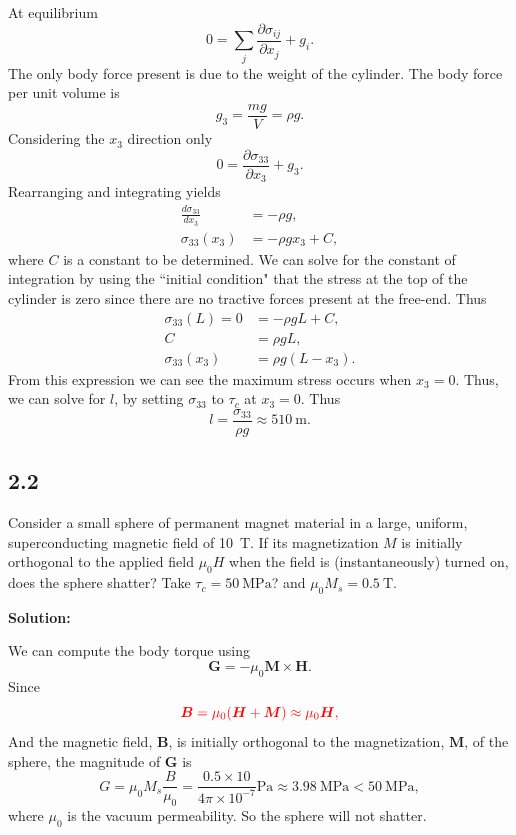 \documentclass[12pt]{article}
\begin{document}
At equilibrium
\begin{equation}
	0 = \sum_{j}\frac{\partial \sigma_{ij}}{\partial x_j} + g_{i}.
\end{equation}
The only body force present is due to the weight of the cylinder. The body force per unit volume is
\begin{equation}
	g_3 = \frac{m g}{V} = \rho g.
\end{equation}
Considering the $x_3$ direction only
\begin{equation}
	0 = \frac{\partial \sigma_{33}}{\partial x_3} + g_{3}.
\end{equation}
Rearranging and integrating yields
\begin{align}
	\frac{ d\sigma_{33} }{ d x_3 } & = -\rho g,         \\
	\sigma_{33}(x_3)               & = -\rho g x_3 + C,
\end{align}
where $C$ is a constant to be determined.
We can solve for the constant of integration by using the ``initial condition"
that the stress at the top of the
cylinder is zero since there are no tractive forces present at the free-end. Thus
\begin{align}
	\sigma_{33}(L) = 0 & = -\rho g L + C,    \\
	C                  & = \rho g L,         \\
	\sigma_{33}(x_3)   & = \rho g (L - x_3).
\end{align}
From this expression we can see
the maximum stress occurs when $x_3 = 0$.
Thus, we can solve for $l$, by setting $\sigma_{33}$ to $\tau_c$ at $x_3 = 0$. Thus
\begin{equation}
	l = \frac{\sigma_{33}}{\rho g} \approx \SI{510}{\meter}.
\end{equation}

\subsection{2.2}
Consider a small sphere of  permanent magnet material in a large,
uniform, superconducting magnetic field of \SI{10}{\tesla}. If its magnetization $M$
is initially orthogonal to the applied field $\mu_0 H$ when the field is (instantaneously)
turned on, does the sphere shatter? Take $\tau_c = \SI{50}{\mega\pascal}$? and
$\mu_0 M_s = \SI{0.5}{\tesla}$.

\textbf{Solution:}

We can compute the body torque using
\begin{equation}
	\bm{G} = -\mu_0 \bm{M} \times \bm{H}.
\end{equation}
Since
\begin{equation}
	{\color{red} \bm{B} = \mu_{0} (\bm{H} + \bm{M}) \approx \mu_{0} \bm{H},}
\end{equation}
And the magnetic field, $\bm{B}$, is initially orthogonal to the magnetization, $\bm{M}$,
of the sphere, the magnitude of $\bm{G}$ is
\begin{equation}
	G = \mu_0 M_s \frac{B}{\mu_0} = \frac{0.5 \times 10}{4 \pi \times 10^{-7}} \si{\pascal} \approx \SI{3.98}{\mega\pascal} < \SI{50}{\mega\pascal},
\end{equation}
where $\mu_0$ is the vacuum permeability.
So the sphere will not shatter.
\end{document}
